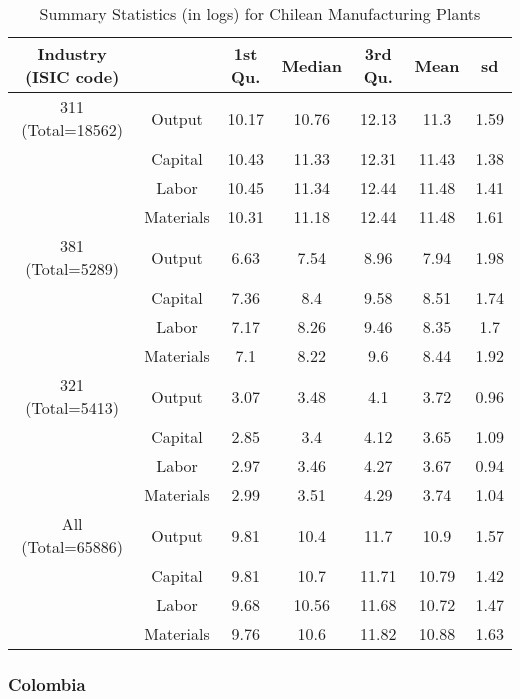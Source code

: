 \documentclass[11pt]{article}
\begin{document}
\begin{table}[H]
\centering
\caption{Summary Statistics (in logs) for Chilean Manufacturing Plants}
\begin{tabular}{ccccccc}
  \hline\hline Industry (ISIC code) &   & 1st Qu. & Median & 3rd Qu. & Mean & sd \\ 
  \hline
311 (Total=18562) & Output & 10.17 & 10.76 & 12.13 & 11.3 & 1.59 \\ 
   & Capital & 10.43 & 11.33 & 12.31 & 11.43 & 1.38 \\ 
   & Labor & 10.45 & 11.34 & 12.44 & 11.48 & 1.41 \\ 
   & Materials & 10.31 & 11.18 & 12.44 & 11.48 & 1.61 \\ 
  381 (Total=5289) & Output & 6.63 & 7.54 & 8.96 & 7.94 & 1.98 \\ 
   & Capital & 7.36 & 8.4 & 9.58 & 8.51 & 1.74 \\ 
   & Labor & 7.17 & 8.26 & 9.46 & 8.35 & 1.7 \\ 
   & Materials & 7.1 & 8.22 & 9.6 & 8.44 & 1.92 \\ 
  321 (Total=5413) & Output & 3.07 & 3.48 & 4.1 & 3.72 & 0.96 \\ 
   & Capital & 2.85 & 3.4 & 4.12 & 3.65 & 1.09 \\ 
   & Labor & 2.97 & 3.46 & 4.27 & 3.67 & 0.94 \\ 
   & Materials & 2.99 & 3.51 & 4.29 & 3.74 & 1.04 \\ 
  All (Total=65886) & Output & 9.81 & 10.4 & 11.7 & 10.9 & 1.57 \\ 
   & Capital & 9.81 & 10.7 & 11.71 & 10.79 & 1.42 \\ 
   & Labor & 9.68 & 10.56 & 11.68 & 10.72 & 1.47 \\ 
   & Materials & 9.76 & 10.6 & 11.82 & 10.88 & 1.63 \\ 
   \hline
\end{tabular}
\label{CHLsum}
\end{table}

\subsubsection{Colombia}
\end{document}

